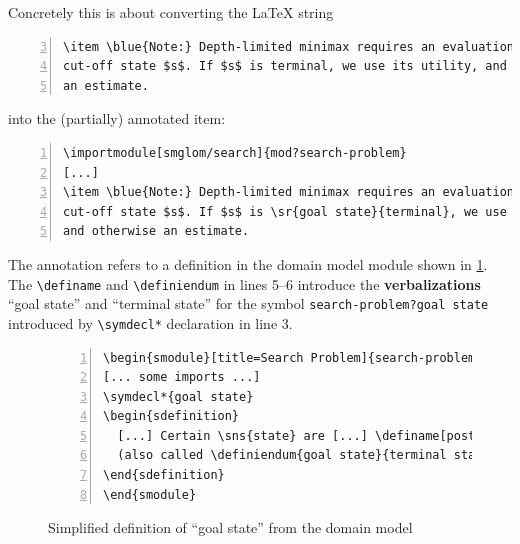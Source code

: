 \documentclass{llncs}
\def\llangle{\langle\kern-.2em\langle}
\def\rrangle{\rangle\kern-.2em\rangle}
\begin{document}
Concretely this is about converting the {\LaTeX} string
\begin{lstlisting}[numbers=left,firstnumber=3,
caption=The (unannotated) {\LaTeX} sources of \cref{fig:lo},label=lst:los]
\item \blue{Note:} Depth-limited minimax requires an evaluation for every
cut-off state $s$. If $s$ is terminal, we use its utility, and otherwise
an estimate.
\end{lstlisting}
into the (partially) annotated item:
\begin{lstlisting}[morekeywords={sr,importmodule},numbers=left,
caption=Annotating ``terminal'' in \cref{lst:los},label=lst:losa]
\importmodule[smglom/search]{mod?search-problem}
[...]
\item \blue{Note:} Depth-limited minimax requires an evaluation for every
cut-off state $s$. If $s$ is \sr{goal state}{terminal}, we use its utility,
and otherwise an estimate.
\end{lstlisting}

The annotation refers to a definition in the domain model module shown in \cref{fig:state-space}.
The \lstinline|\definame| and \lstinline|\definiendum| in lines 5--6 introduce the \textbf{verbalizations} ``goal state'' and ``terminal state'' for the symbol \lstinline|search-problem?goal state| introduced by \lstinline|\symdecl*| declaration in line 3.

\begin{figure}[ht]\centering
\begin{lstlisting}[morekeywords={definame,symdecl,definiendum},numbers=left]
\begin{smodule}[title=Search Problem]{search-problem}
[... some imports ...]
\symdecl*{goal state}
\begin{sdefinition}
  [...] Certain \sns{state} are [...] \definame[post=s]{goal state} [...]
  (also called \definiendum{goal state}{terminal states}).
\end{sdefinition}
\end{smodule}
\end{lstlisting}
  \caption{Simplified definition of ``goal state'' from the domain model}\label{fig:state-space}
\end{figure}
\end{document}
